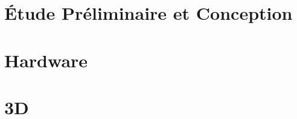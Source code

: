 \documentclass[
10pt, %
a4paper, %
oneside, %
headinclude,footinclude, %
BCOR5mm, %
]{scrartcl}
\begin{document}
\newpage


\section{Étude Préliminaire et Conception} %

\newpage


\section{Hardware} %

\newpage



\section{3D} %

\newpage

\end{document}
